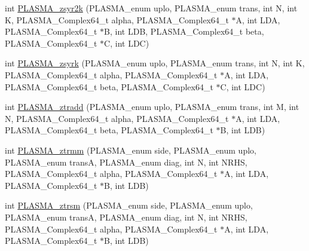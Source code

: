 \begin{DoxyCompactItemize}
\item 
int \hyperlink{group__PLASMA__Complex64__t_ga575230c6f1629fabf7ba151a09e4c7a7_ga575230c6f1629fabf7ba151a09e4c7a7}{P\+L\+A\+S\+M\+A\+\_\+zsyr2k} (P\+L\+A\+S\+M\+A\+\_\+enum uplo, P\+L\+A\+S\+M\+A\+\_\+enum trans, int N, int K, P\+L\+A\+S\+M\+A\+\_\+\+Complex64\+\_\+t alpha, P\+L\+A\+S\+M\+A\+\_\+\+Complex64\+\_\+t $\ast$A, int L\+D\+A, P\+L\+A\+S\+M\+A\+\_\+\+Complex64\+\_\+t $\ast$B, int L\+D\+B, P\+L\+A\+S\+M\+A\+\_\+\+Complex64\+\_\+t beta, P\+L\+A\+S\+M\+A\+\_\+\+Complex64\+\_\+t $\ast$C, int L\+D\+C)
\item 
int \hyperlink{group__PLASMA__Complex64__t_gaae2f934da463e7256c82500587c3042b_gaae2f934da463e7256c82500587c3042b}{P\+L\+A\+S\+M\+A\+\_\+zsyrk} (P\+L\+A\+S\+M\+A\+\_\+enum uplo, P\+L\+A\+S\+M\+A\+\_\+enum trans, int N, int K, P\+L\+A\+S\+M\+A\+\_\+\+Complex64\+\_\+t alpha, P\+L\+A\+S\+M\+A\+\_\+\+Complex64\+\_\+t $\ast$A, int L\+D\+A, P\+L\+A\+S\+M\+A\+\_\+\+Complex64\+\_\+t beta, P\+L\+A\+S\+M\+A\+\_\+\+Complex64\+\_\+t $\ast$C, int L\+D\+C)
\item 
int \hyperlink{group__PLASMA__Complex64__t_ga6d77250f7c47e6f8a07055c4417a8a75_ga6d77250f7c47e6f8a07055c4417a8a75}{P\+L\+A\+S\+M\+A\+\_\+ztradd} (P\+L\+A\+S\+M\+A\+\_\+enum uplo, P\+L\+A\+S\+M\+A\+\_\+enum trans, int M, int N, P\+L\+A\+S\+M\+A\+\_\+\+Complex64\+\_\+t alpha, P\+L\+A\+S\+M\+A\+\_\+\+Complex64\+\_\+t $\ast$A, int L\+D\+A, P\+L\+A\+S\+M\+A\+\_\+\+Complex64\+\_\+t beta, P\+L\+A\+S\+M\+A\+\_\+\+Complex64\+\_\+t $\ast$B, int L\+D\+B)
\item 
int \hyperlink{group__PLASMA__Complex64__t_ga9d25baa9dfdb84cd69270558338ce9b1_ga9d25baa9dfdb84cd69270558338ce9b1}{P\+L\+A\+S\+M\+A\+\_\+ztrmm} (P\+L\+A\+S\+M\+A\+\_\+enum side, P\+L\+A\+S\+M\+A\+\_\+enum uplo, P\+L\+A\+S\+M\+A\+\_\+enum trans\+A, P\+L\+A\+S\+M\+A\+\_\+enum diag, int N, int N\+R\+H\+S, P\+L\+A\+S\+M\+A\+\_\+\+Complex64\+\_\+t alpha, P\+L\+A\+S\+M\+A\+\_\+\+Complex64\+\_\+t $\ast$A, int L\+D\+A, P\+L\+A\+S\+M\+A\+\_\+\+Complex64\+\_\+t $\ast$B, int L\+D\+B)
\item 
int \hyperlink{group__PLASMA__Complex64__t_ga36cf60d55716c7ab0c2fba7fb8833e2c_ga36cf60d55716c7ab0c2fba7fb8833e2c}{P\+L\+A\+S\+M\+A\+\_\+ztrsm} (P\+L\+A\+S\+M\+A\+\_\+enum side, P\+L\+A\+S\+M\+A\+\_\+enum uplo, P\+L\+A\+S\+M\+A\+\_\+enum trans\+A, P\+L\+A\+S\+M\+A\+\_\+enum diag, int N, int N\+R\+H\+S, P\+L\+A\+S\+M\+A\+\_\+\+Complex64\+\_\+t alpha, P\+L\+A\+S\+M\+A\+\_\+\+Complex64\+\_\+t $\ast$A, int L\+D\+A, P\+L\+A\+S\+M\+A\+\_\+\+Complex64\+\_\+t $\ast$B, int L\+D\+B)
\item 

\end{DoxyCompactItemize}

